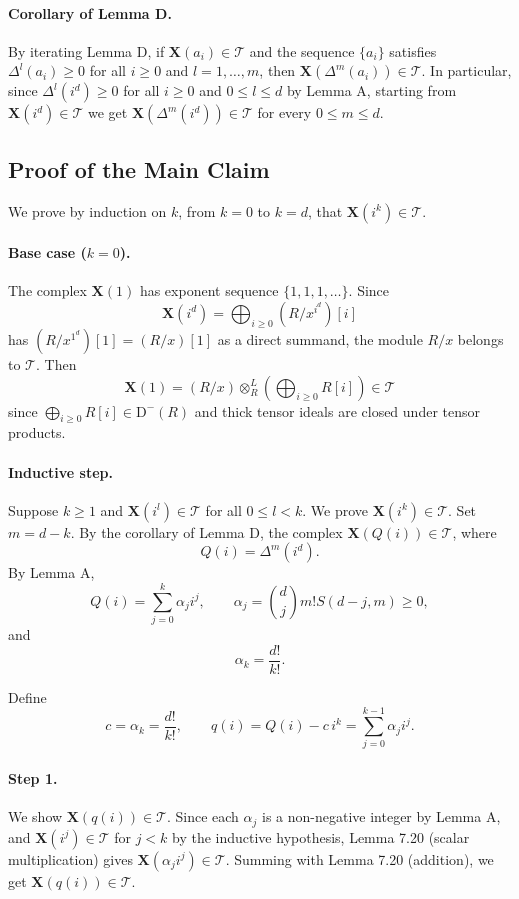 \documentclass[11pt]{article}
\newcommand{\Db}{\mathrm{D}^{-}(R)}
\newcommand{\XX}{\mathbf{X}}
\newcommand{\TT}{\mathcal{T}}
\begin{document}
\paragraph{Corollary of Lemma D.}
By iterating Lemma D, if $\XX(a_i)\in\TT$ and the sequence $\{a_i\}$ satisfies $\Delta^l(a_i)\geqslant 0$ for all $i \geqslant 0$ and $l=1,\ldots,m$, then $\XX(\Delta^m(a_i))\in\TT$. In particular, since $\Delta^l(i^d)\geqslant 0$ for all $i \geqslant 0$ and $0 \leqslant l \leqslant d$ by Lemma A, starting from $\XX(i^d)\in\TT$ we get $\XX(\Delta^m(i^d))\in\TT$ for every $0 \leqslant m \leqslant d$.

\subsection*{Proof of the Main Claim}

We prove by induction on $k$, from $k=0$ to $k=d$, that $\XX(i^k)\in\TT$.

\paragraph{Base case ($k=0$).}
The complex $\XX(1)$ has exponent sequence $\{1,1,1,\ldots\}$. Since
\[
\XX(i^d)=\bigoplus_{i \geqslant 0}(R/x^{i^d})[i]
\]
has $(R/x^{1^d})[1]=(R/x)[1]$ as a direct summand, the module $R/x$ belongs to $\TT$. Then
\[
\XX(1)=(R/x)\otimes_R^{L}\left(\bigoplus_{i \geqslant 0} R[i]\right)\in\TT
\]
since $\bigoplus_{i \geqslant 0} R[i]\in\Db$ and thick tensor ideals are closed under tensor products.

\paragraph{Inductive step.}
Suppose $k \geqslant 1$ and $\XX(i^l)\in\TT$ for all $0 \leqslant l<k$. We prove $\XX(i^k)\in\TT$. Set $m=d-k$. By the corollary of Lemma D, the complex $\XX(Q(i))\in\TT$, where
\[
Q(i)=\Delta^m(i^d).
\]
By Lemma A,
\[
Q(i)=\sum_{j=0}^{k}\alpha_j i^j,
\qquad
\alpha_j=\binom{d}{j}m!S(d-j,m)\geqslant 0,
\]
and
\[
\alpha_k=\frac{d!}{k!}.
\]

Define
\[
c=\alpha_k=\frac{d!}{k!},
\qquad
q(i)=Q(i)-c\,i^k=\sum_{j=0}^{k-1}\alpha_j i^j.
\]

\paragraph{Step 1.}
We show $\XX(q(i))\in\TT$. Since each $\alpha_j$ is a non-negative integer by Lemma A, and $\XX(i^j)\in\TT$ for $j<k$ by the inductive hypothesis, Lemma 7.20 (scalar multiplication) gives $\XX(\alpha_j i^j)\in\TT$. Summing with Lemma 7.20 (addition), we get $\XX(q(i))\in\TT$.
\end{document}

